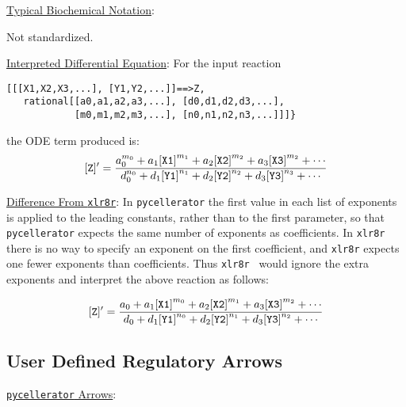 \underline{Typical Biochemical Notation}: 

Not standardized.

\underline{Interpreted Differential Equation}:
For the input reaction
\begin{lstlisting}
[[[X1,X2,X3,...], [Y1,Y2,...]]==>Z, 
   rational[[a0,a1,a2,a3,...], [d0,d1,d2,d3,...],
            [m0,m1,m2,m3,...], [n0,n1,n2,n3,...]]]}
\end{lstlisting}
the ODE term produced is: 
\begin{equation*}
{\tt [Z]'} = 
\dfrac{a_0^{m_0} + a_1{\tt [X1]}^{m_1} + a_2{\tt [X2]}^{m_2} + a_3{\tt [X3]}^{m_2} + \cdots}
{d_0^{n_0} + d_1{\tt {[Y1]}}^{n_1} + d_2{\tt [Y2]}^{n_2} + d_3{\tt [Y3]}^{n_3}+ \cdots}
\end{equation*}

\underline{Difference From {\tt xlr8r}}: In {\tt pycellerator} the first value in each list of exponents is applied to the leading constants, rather than to the first parameter, so that {\tt pycellerator} expects the same number of exponents as coefficients. In {\tt xlr8r} there is no way to specify an exponent on the first coefficient, and {\tt xlr8r} expects one fewer exponents than coefficients. Thus {\tt xlr8r } would ignore the extra exponents and interpret the above reaction as follows: 

\begin{equation*}
{\tt [Z]'} = 
\dfrac{a_0 + a_1{\tt [X1]}^{m_0} + a_2{\tt [X2]}^{m_1} + a_3{\tt [X3]}^{m_2} + \cdots}
{d_0 + d_1{\tt [Y1]}^{n_0} + d_2{\tt [Y2]}^{n_1} + d_3{\tt [Y3]}^{n_2}+ \cdots}
\end{equation*}

\subsection{User Defined Regulatory Arrows}


\label{subsection:USER}
\underline{{\tt pycellerator} Arrows}:

